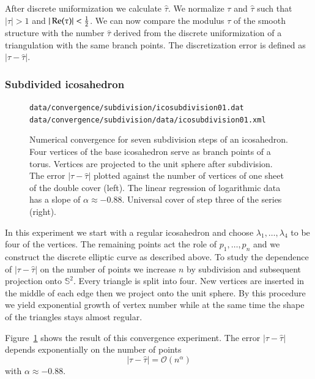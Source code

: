 \documentclass[Thesis.tex]{subfiles}
\begin{document}
After discrete uniformization we calculate $\hat \tau$. We normalize $\tau$ and $\hat \tau$ such that $|\tau|>1$ and $|\operatorname{Re}(\tau)| < \frac{1}{2}$. We can now compare the modulus $\tau$ of the smooth structure with the number $\hat \tau$ derived from the discrete uniformization of a triangulation with the same branch points. The discretization error is defined as $|\tau-\hat \tau|$.

\subsubsection{Subdivided icosahedron}

\begin{figure}
\centering
{}
{\scriptsize\tt data/convergence/subdivision/icosubdivision01.dat}\\
{\scriptsize\tt data/convergence/subdivision/data/icosubdivision01.xml}
\caption{Numerical convergence for seven subdivision steps of an icosahedron.
Four vertices of the base icosahedron serve as branch points of a torus.
Vertices are projected to the unit sphere after subdivision.
The error $|\tau - \hat\tau|$ plotted against the number of vertices of one sheet of the double cover (left).
The linear regression of logarithmic data has a slope of $\alpha\approx-0.88$.
Universal cover of step three of the series (right).
}
\label{fig:convergence_subdivision}
\end{figure}

In this experiment we start with a regular icosahedron and choose $\lambda_1,\ldots,\lambda_4$ to be four of the vertices. The remaining points act the role of $p_1,\ldots,p_n$ and we construct the discrete elliptic curve as described above. To study the dependence of $|\tau-\hat \tau|$ on the number of points we increase $n$ by subdivision and subsequent projection onto $\mathbb S^2$. Every triangle is split into four. New vertices are inserted in the middle of each edge then we project onto the unit sphere. By this procedure we yield exponential growth of vertex number while at the same time the shape of the triangles stays almost regular.

Figure~\ref{fig:convergence_subdivision} shows the result of this convergence experiment. The error $|\tau-\hat \tau|$ depends exponentially on the number of points
\[|\tau-\hat \tau|=\mathcal O (n^\alpha)\]
with $\alpha \approx -0.88$.
\end{document}
